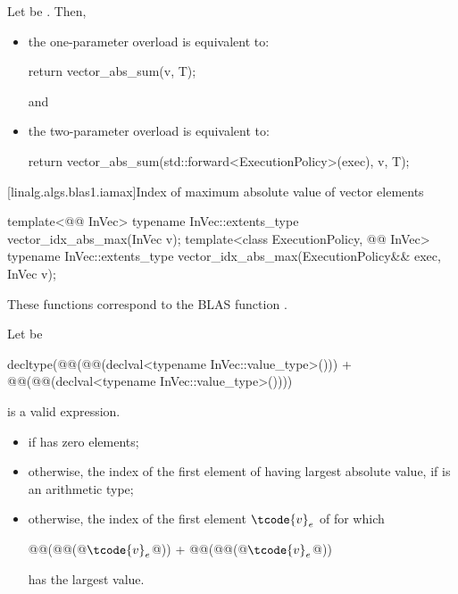 \begin{itemdescr}
\pnum
\effects
Let  be .
Then,
\begin{itemize}
\item
the one-parameter overload is equivalent to:
\begin{codeblock}
return vector_abs_sum(v, T{});
\end{codeblock}
and
\item
the two-parameter overload is equivalent to:
\begin{codeblock}
return vector_abs_sum(std::forward<ExecutionPolicy>(exec), v, T{});
\end{codeblock}
\end{itemize}
\end{itemdescr}

[linalg.algs.blas1.iamax]{Index of maximum absolute value of vector elements}

%
\begin{itemdecl}
template<@@ InVec>
  typename InVec::extents_type vector_idx_abs_max(InVec v);
template<class ExecutionPolicy, @@ InVec>
  typename InVec::extents_type vector_idx_abs_max(ExecutionPolicy&& exec, InVec v);
\end{itemdecl}

\begin{itemdescr}
\pnum
\begin{note}
These functions correspond to the BLAS function \supercite{blas1}.
\end{note}

\pnum
Let  be
\begin{codeblock}
decltype(@@(@@(declval<typename InVec::value_type>())) +
         @@(@@(declval<typename InVec::value_type>())))
\end{codeblock}

\pnum
\mandates
{} is a valid expression.

\pnum
\returns
\begin{itemize}
\item
{}
      if  has zero elements;
\item
otherwise, the index of the first element of 
having largest absolute value,
if  is an arithmetic type;
\item
otherwise, the index of the first element $\tcode{v}_e$ of 
for which
\begin{codeblock}
@@(@@(@$\tcode{v}_e$@)) + @@(@@(@$\tcode{v}_e$@))
\end{codeblock}
has the largest value.
\end{itemize}
\end{itemdescr}

